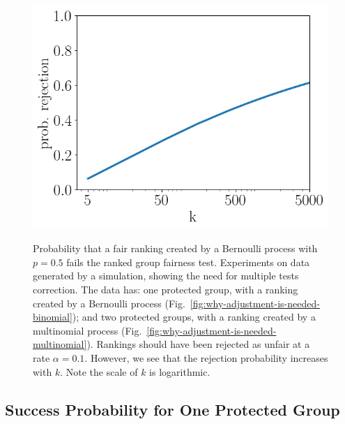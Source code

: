 \begin{figure}[h]
	\centering
	{\includegraphics[width=.48\textwidth]{pics/failProbPlotBinom.png}}
	\caption{
		Probability that a fair ranking created by a Bernoulli process with $p=0.5$ fails the ranked group fairness test.\label{fig:why-adjustment-is-needed-binomial}
		Experiments on data generated by a simulation, showing the need for multiple tests correction.
		The data has: one protected group, with a ranking created by  a Bernoulli process (Fig.~\ref{fig:why-adjustment-is-needed-binomial}); and two protected groups, with a ranking created by a multinomial process (Fig.~\ref{fig:why-adjustment-is-needed-multinomial}).
		Rankings should have been rejected as unfair at a rate $\alpha = 0.1$.
		However, we see that the rejection probability increases with $k$.
		Note the scale of $k$ is logarithmic.}
	\label{fig:need-for-model-adjustment}
\end{figure}

\subsection{Success Probability for One Protected Group}\label{subsubsec:adjustment-binomial}

